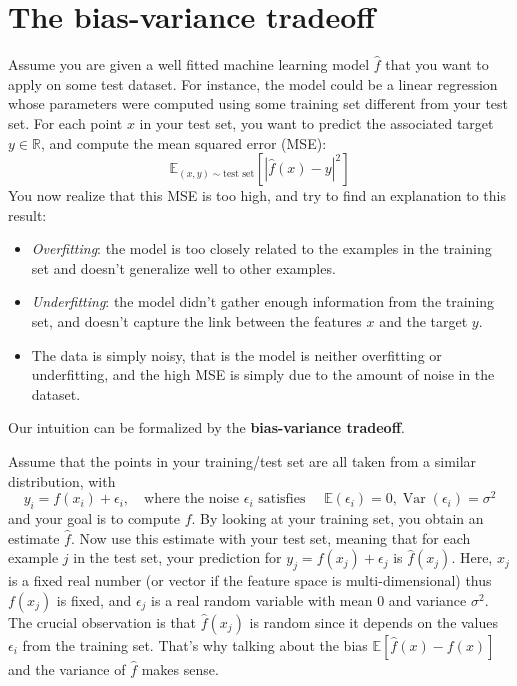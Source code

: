 \vspace{1cm}
\section{The bias-variance tradeoff}
Assume you are given a well fitted machine learning model $\hat{f}$ that you want to apply on
some test dataset. For instance, the model could be a linear regression whose parameters
were computed using some training set different from your test set. For each point $x$ in your
test set, you want to predict the associated target $y \in \mathbb R$, and compute the mean squared
error (MSE):
\begin{equation}
    \mathbb E_{(x,y)\sim\text{test set}} \left[|\hat{f}(x) - y|^2\right]    
\end{equation}
You now realize that this MSE is too high, and try to find an explanation to this result:
\begin{itemize}
    \item \textit{Overfitting}: the model is too closely related to the examples in the training set and
    doesn't generalize well to other examples.
    \item \textit{Underfitting}: the model didn't gather enough information from the training set, and
    doesn't capture the link between the features $x$ and the target $y$.
    \item The data is simply noisy, that is the model is neither overfitting or underfitting, and
    the high MSE is simply due to the amount of noise in the dataset.
\end{itemize}
Our intuition can be formalized by the \textbf{bias-variance tradeoff}.

Assume that the points in your training/test set are all taken from a similar distribution,
with
\begin{equation}
    y_i = f(x_i) + \epsilon_i, \quad \text{where the noise $\epsilon_i$ satisfies } \quad \mathbb E(\epsilon_i) = 0, \operatorname{Var}(\epsilon_i ) = \sigma^2    
\end{equation}
and your goal is to compute $f$. By looking at your training set, you obtain an estimate $\hat{f}$.
Now use this estimate with your test set, meaning that for each example $j$ in the test set,
your prediction for $y_j = f(x_j) + \epsilon_j$ is $\hat{f}(x_j)$. Here, $x_j$ is a fixed real number (or vector if the
feature space is multi-dimensional) thus $f(x_j)$ is fixed, and $\epsilon_j$ is a real random variable with
mean $0$ and variance $\sigma^2$. The crucial observation is that $\hat{f}(x_j)$ is random since it depends on
the values $\epsilon_i$ from the training set. That's why talking about the bias $\mathbb E[ \hat{f}(x) - f(x)]$ and
the variance of $\hat{f}$ makes sense.

